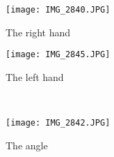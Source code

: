 \begin{figure}[H]
	\centering
	\begin{minipage}{0.4\textwidth}
	\centering
	\texttt{[image: IMG\_2840.JPG]}
	\caption{The right hand}
	\label{fig:right_hand_position}
	\end{minipage}
	\hfill
	\begin{minipage}{0.4\textwidth}
	\centering
	\vspace{1cm}
	\texttt{[image: IMG\_2845.JPG]}
	\caption{The left hand}
	\label{fig:left_hand_position}
	\end{minipage}
	\\
	\centering
	\begin{minipage}{0.4\textwidth}
	\centering
	\texttt{[image: IMG\_2842.JPG]}
	\caption{The angle}
	\label{fig:angle}
	\end{minipage}
	\hfill*

\end{figure}


